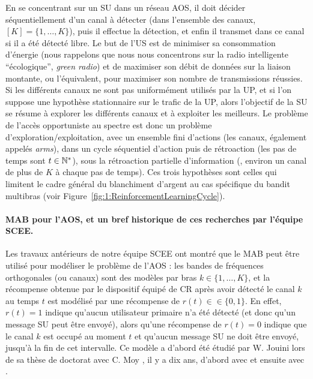 \begin{resume_fr}
En se concentrant sur un SU dans un réseau AOS, il doit décider séquentiellement d'un canal à détecter (dans l'ensemble des canaux, $[K]=\{1,\dots,K\}$), puis il effectue la détection, et enfin il transmet dans ce canal si il a été détecté libre.
Le but de l'US est de minimiser sa consommation d'énergie (nous rappelons que nous nous concentrons sur la radio intelligente ``écologique'', \emph{green radio}) et de maximiser son débit de données sur la liaison montante, ou l'équivalent, pour maximiser son nombre de transmissions réussies.
%
Si les différents canaux ne sont pas uniformément utilisés par la UP, et si l'on suppose une hypothèse stationnaire sur le trafic de la UP, alors l'objectif de la SU se résume à explorer les différents canaux et à exploiter les meilleurs.
Le problème de l'accès opportuniste au spectre est donc un problème d'exploration/exploitation, avec un ensemble fini d'actions (les canaux, également appelés \emph{arms}),
dans un cycle séquentiel d'action puis de rétroaction (les pas de temps sont $t\in\mathbb{N}^*$),
sous la rétroaction partielle d'information (\ie, environ un canal de plus de $K$ à chaque pas de temps).
Ces trois hypothèses sont celles qui limitent le cadre général du blanchiment d'argent au cas spécifique du bandit multibras (voir Figure~\ref{fig:1:ReinforcementLearningCycle}).


\paragraph{MAB pour l'AOS, et un bref historique de ces recherches par l'équipe SCEE.}
%
Les travaux antérieurs de notre équipe SCEE ont montré que le MAB peut être utilisé pour modéliser le problème de l'AOS :
les bandes de fréquences orthogonales (ou canaux) sont des modèles par bras $k\in\{1,\dots,K\}$,
et la récompense obtenue par le dispositif équipé de CR après avoir détecté le canal $k$ au temps $t$ est modélisé par une récompense de $r(t) \in \in \{0,1\}$.
En effet, $r(t) = 1$ indique qu'aucun utilisateur primaire n'a été détecté (et donc qu'un message SU peut être envoyé), alors qu'une récompense de $r(t)=0$ indique que le canal $k$ est occupé au moment $t$ et qu'aucun message SU ne doit être envoyé, jusqu'à la fin de cet intervalle.
%
Ce modèle a d'abord été étudié par W. Jouini lors de sa thèse de doctorat avec C. Moy \cite{Jouini12PhD}, il y a dix ans, d'abord avec \cite{Jouini09} et ensuite avec \cite{Jouini10,Jouini12}.


\end{resume_fr}

